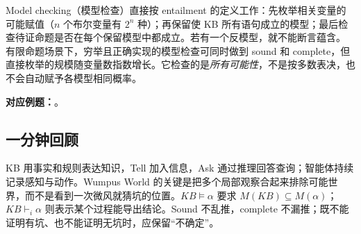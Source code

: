Model checking（模型检查）直接按 entailment 的定义工作：先枚举相关变量的可能赋值（$n$ 个布尔变量有 $2^n$ 种）；再保留使 KB 所有语句成立的模型；最后检查待证命题是否在每个保留模型中都成立。若有一个反模型，就不能断言蕴含。
有限命题场景下，穷举且正确实现的模型检查可同时做到 sound 和 complete，但直接枚举的规模随变量数指数增长。它检查的是\emph{所有可能性}，不是按多数表决，也不会自动赋予各模型相同概率。

\textbf{对应例题：}。

\subsection{一分钟回顾}

KB 用事实和规则表达知识，Tell 加入信息，Ask 通过推理回答查询；智能体持续记录感知与动作。Wumpus World 的关键是把多个局部观察合起来排除可能世界，而不是看到一次微风就猜坑的位置。$KB\models\alpha$ 要求 $M(KB)\subseteq M(\alpha)$；$KB\vdash_i\alpha$ 则表示某个过程能导出结论。Sound 不乱推，complete 不漏推；既不能证明有坑、也不能证明无坑时，应保留“不确定”。
